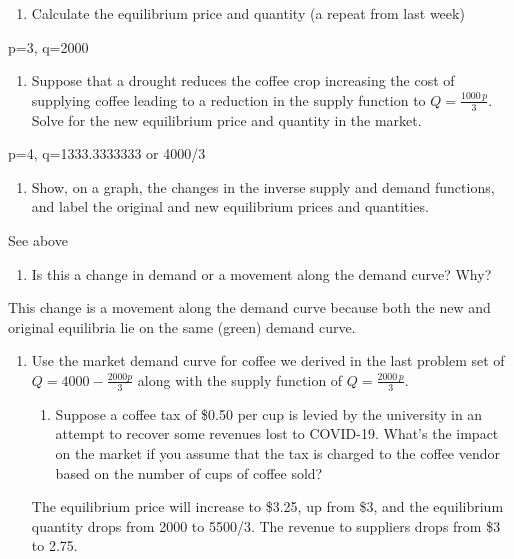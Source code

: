 \documentclass[11pt,]{article}
\providecommand{\tightlist}{%
  \setlength{\itemsep}{0pt}\setlength{\parskip}{0pt}}
\begin{document}
\begin{enumerate}
\def\labelenumi{\alph{enumi})}
\tightlist
\item
  Calculate the equilibrium price and quantity (a repeat from last week)
\end{enumerate}

p=3, q=2000

\begin{enumerate}
\def\labelenumi{\alph{enumi})}
\setcounter{enumi}{1}
\tightlist
\item
  Suppose that a drought reduces the coffee crop increasing the cost of
  supplying coffee leading to a reduction in the supply function to
  \(Q=\frac{1000\,p}{3}\). Solve for the new equilibrium price and
  quantity in the market.
\end{enumerate}

p=4, q=1333.3333333 or 4000/3

\begin{enumerate}
\def\labelenumi{\alph{enumi})}
\setcounter{enumi}{2}
\tightlist
\item
  Show, on a graph, the changes in the inverse supply and demand
  functions, and label the original and new equilibrium prices and
  quantities.
\end{enumerate}

See above

\begin{enumerate}
\def\labelenumi{\alph{enumi})}
\setcounter{enumi}{3}
\tightlist
\item
  Is this a change in demand or a movement along the demand curve? Why?
\end{enumerate}

This change is a movement along the demand curve because both the new
and original equilibria lie on the same (green) demand curve.

\newpage

\begin{enumerate}
\def\labelenumi{\arabic{enumi}.}
\setcounter{enumi}{1}
\tightlist
\item
  Use the market demand curve for coffee we derived in the last problem
  set of \(Q=4000-\frac{2000p}{3}\) along with the supply function of
  \(Q=\frac{2000\,p}{3}\).

  \begin{enumerate}
  \def\labelenumii{\alph{enumii})}
  \tightlist
  \item
    Suppose a coffee tax of \$0.50 per cup is levied by the university
    in an attempt to recover some revenues lost to COVID-19. What's the
    impact on the market if you assume that the tax is charged to the
    coffee vendor based on the number of cups of coffee sold?
  \end{enumerate}

  The equilibrium price will increase to \$3.25, up from \$3, and the
  equilibrium quantity drops from 2000 to 5500/3. The revenue to
  suppliers drops from \$3 to 2.75.
\end{enumerate}
\end{document}
